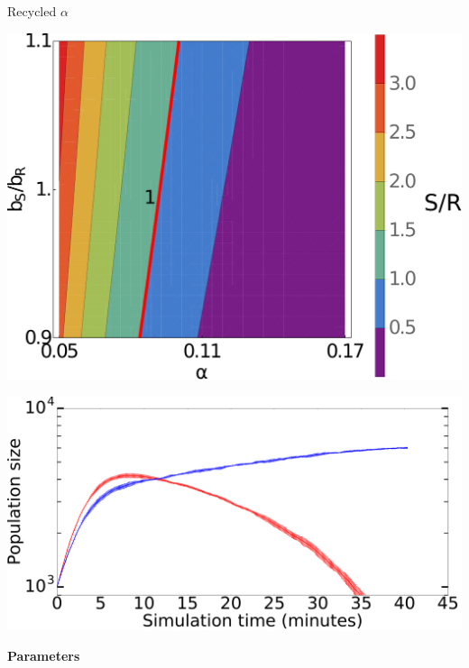 \documentclass[final]{beamer}
\newlength{\onecolwid}
\newlength{\figwid}
\begin{document}
\begin{frame}[t]
\begin{block}
\begin{columns}[t]
\begin{column}{\onecolwid}
  \begin{block}{Recycled $\alpha$}
    \begin{center}
      \includegraphics[width=\figwid]{../dev/graphics/poster/recycled_contour.pdf}
      \vspace{1.5ex}
        \begin{minipage}[h]{0.6\onecolwid}
        \includegraphics[width=.9\figwid]{../dev/graphics/poster/recycled_pop.pdf}
      \end{minipage}%
      \begin{minipage}[h]{.3\onecolwid}
        \vfill \textbf{Parameters} \vspace{3mm}\\
        \begin{tabular}{l  r  c|c  l  r}

\end{tabular}
\end{minipage}
\end{center}
\end{block}
\end{column}
\end{columns}
\end{block}
\end{frame}
\end{document}
